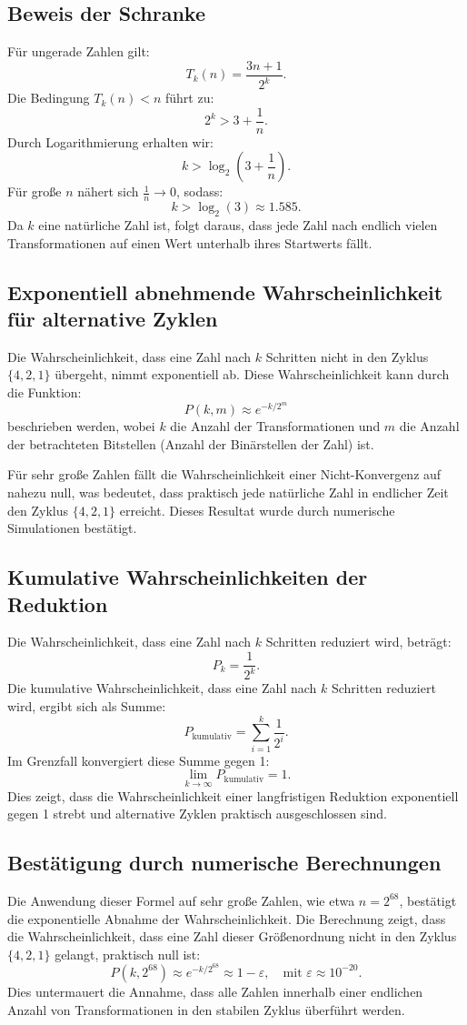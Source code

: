 \documentclass[a4paper,12pt]{article}
\begin{document}
\subsection{Beweis der Schranke}
Für ungerade Zahlen gilt:
\[
T_k(n) = \frac{3n + 1}{2^k}.
\]
Die Bedingung \( T_k(n) < n \) führt zu:
\[
2^k > 3 + \frac{1}{n}.
\]
Durch Logarithmierung erhalten wir:
\[
k > \log_2(3 + \frac{1}{n}).
\]
Für große \( n \) nähert sich \( \frac{1}{n} \to 0 \), sodass:
\[
k > \log_2(3) \approx 1.585.
\]
Da \( k \) eine natürliche Zahl ist, folgt daraus, dass jede Zahl nach endlich vielen Transformationen auf einen Wert unterhalb ihres Startwerts fällt.

\subsection{Exponentiell abnehmende Wahrscheinlichkeit für alternative Zyklen}
Die Wahrscheinlichkeit, dass eine Zahl nach \( k \) Schritten nicht in den Zyklus \( \{4,2,1\} \) übergeht, nimmt exponentiell ab. Diese Wahrscheinlichkeit kann durch die Funktion:
\[
P(k, m) \approx e^{-k/2^m}
\]
beschrieben werden, wobei \( k \) die Anzahl der Transformationen und \( m \) die Anzahl der betrachteten Bitstellen (Anzahl der Binärstellen der Zahl) ist.

Für sehr große Zahlen fällt die Wahrscheinlichkeit einer Nicht-Konvergenz auf nahezu null, was bedeutet, dass praktisch jede natürliche Zahl in endlicher Zeit den Zyklus \( \{4,2,1\} \) erreicht. Dieses Resultat wurde durch numerische Simulationen bestätigt.

\subsection{Kumulative Wahrscheinlichkeiten der Reduktion}
Die Wahrscheinlichkeit, dass eine Zahl nach \( k \) Schritten reduziert wird, beträgt:
\[
P_k = \frac{1}{2^k}.
\]
Die kumulative Wahrscheinlichkeit, dass eine Zahl nach \( k \) Schritten reduziert wird, ergibt sich als Summe:
\[
P_{\text{kumulativ}} = \sum_{i=1}^k \frac{1}{2^i}.
\]
Im Grenzfall konvergiert diese Summe gegen 1:
\[
\lim_{k \to \infty} P_{\text{kumulativ}} = 1.
\]
Dies zeigt, dass die Wahrscheinlichkeit einer langfristigen Reduktion exponentiell gegen 1 strebt und alternative Zyklen praktisch ausgeschlossen sind.

\subsection{Bestätigung durch numerische Berechnungen}
Die Anwendung dieser Formel auf sehr große Zahlen, wie etwa \( n = 2^{68} \), bestätigt die exponentielle Abnahme der Wahrscheinlichkeit. Die Berechnung zeigt, dass die Wahrscheinlichkeit, dass eine Zahl dieser Größenordnung nicht in den Zyklus \( \{4,2,1\} \) gelangt, praktisch null ist:
\[
P(k, 2^{68}) \approx e^{-k/2^{68}} \approx 1 - \varepsilon, \quad \text{mit } \varepsilon \approx 10^{-20}.
\]
Dies untermauert die Annahme, dass alle Zahlen innerhalb einer endlichen Anzahl von Transformationen in den stabilen Zyklus überführt werden.
\end{document}
